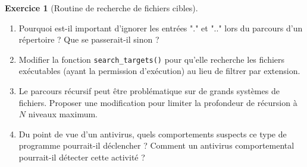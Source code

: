 \documentclass[a4paper,11pt]{article}
\theoremstyle{plain}
\theoremstyle{definition}
\newtheorem{exercice}{Exercice}
\begin{document}
\begin{exercice}[Routine de recherche de fichiers cibles]
\begin{enumerate}
\item Pourquoi est-il important d'ignorer les entrées "." et ".." lors du parcours d'un répertoire ? Que se passerait-il sinon ?

\item Modifier la fonction \texttt{search\_targets()} pour qu'elle recherche les fichiers exécutables (ayant la permission d'exécution) au lieu de filtrer par extension.

\item Le parcours récursif peut être problématique sur de grands systèmes de fichiers. Proposer une modification pour limiter la profondeur de récursion à $N$ niveaux maximum.

\item Du point de vue d'un antivirus, quels comportements suspects ce type de programme pourrait-il déclencher ? Comment un antivirus comportemental pourrait-il détecter cette activité ?
\end{enumerate}

\end{exercice}
\end{document}
